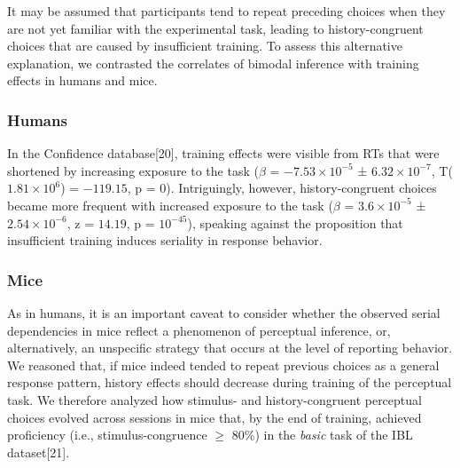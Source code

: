 \documentclass[
]{article}
\begin{document}
It may be assumed that participants tend to repeat preceding choices
when they are not yet familiar with the experimental task, leading to
history-congruent choices that are caused by insufficient training. To
assess this alternative explanation, we contrasted the correlates of
bimodal inference with training effects in humans and mice.

\hypertarget{humans-1}{%
\subsubsection{Humans}\label{humans-1}}

In the Confidence database{[}20{]}, training effects were visible from
RTs that were shortened by increasing exposure to the task (\(\beta\) =
\(\ensuremath{-7.53\times 10^{-5}}\) ±
\(\ensuremath{6.32\times 10^{-7}}\),
T(\(\ensuremath{1.81\times 10^{6}}\)) = \(-119.15\), p = \(0\)).
Intriguingly, however, history-congruent choices became more frequent
with increased exposure to the task (\(\beta\) =
\(\ensuremath{3.6\times 10^{-5}}\) ±
\(\ensuremath{2.54\times 10^{-6}}\), z = \(14.19\), p =
\(\ensuremath{10^{-45}}\)), speaking against the proposition that
insufficient training induces seriality in response behavior.

\hypertarget{mice-1}{%
\subsubsection{Mice}\label{mice-1}}

As in humans, it is an important caveat to consider whether the observed
serial dependencies in mice reflect a phenomenon of perceptual
inference, or, alternatively, an unspecific strategy that occurs at the
level of reporting behavior. We reasoned that, if mice indeed tended to
repeat previous choices as a general response pattern, history effects
should decrease during training of the perceptual task. We therefore
analyzed how stimulus- and history-congruent perceptual choices evolved
across sessions in mice that, by the end of training, achieved
proficiency (i.e., stimulus-congruence \(\geq\) 80\%) in the
\emph{basic} task of the IBL dataset{[}21{]}.
\end{document}

